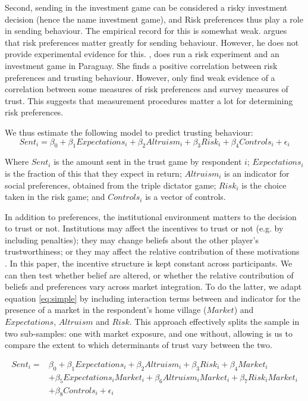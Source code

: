 Second, sending in the investment game can be considered a risky investment decision (hence the name investment game), and Risk preferences thus play a role in sending behaviour. The empirical record for this is somewhat weak. \cite{Karlan2005} argues that risk preferences matter greatly for sending behaviour. However, he does not provide experimental evidence for this. \cite{Schechter2007}, does run a risk experiment and an investment game in Paraguay. She finds a positive correlation between risk preferences and trusting behaviour. However,  \cite{Eckel2004} only find weak evidence of a correlation between some measures of risk preferences and survey measures of trust. This suggests that measurement procedures matter a lot for determining risk preferences.

We thus estimate the following model to predict trusting behaviour:
\begin{equation}
\label{eq:simple}
Sent_i = \beta_0 + \beta_1 Expectations_i + \beta_2 Altruism_i + \beta_3 Risk_i + \beta_4 Controls_i + \epsilon_i 
\end{equation} 

Where $Sent_i$ is the amount sent in the trust game by respondent $i$; $Expectations_i$ is the fraction of this that they expect in return;  $Altruism_i$ is an indicator for social preferences, obtained from the triple dictator game; $Risk_i$ is the choice taken in the risk game; and $Controls_i$ is a vector of controls.

In addition to preferences, the institutional environment matters to the decision to trust or not. Institutions may affect the incentives to trust or not (e.g. by including penalties); they may change beliefs about the other player's trustworthiness; or they may affect the relative contribution of these motivations \citep{Bohnet2007}. In this paper, the incentive structure is kept constant across participants. We can then test whether belief are altered, or whether the relative contribution of beliefs and preferences vary across market integration. To do the latter, we adapt equation \ref{eq:simple} by including interaction terms between and indicator for the presence of a market in the respondent's home village ($Market$) and $Expectations$, $Altruism$ and $Risk$. This approach effectively splits the sample in two sub-samples: one with market exposure, and one without, allowing is us to compare the extent to which determinants of trust vary between the two.

\begin{equation}
\begin{split}
\label{eq:interaction}
Sent_i = & \beta_0 + \beta_1 Expectations_i + \beta_2 Altruism_i + \beta_3 Risk_i + \beta_4 Market_i \\
&+  \beta_5 Expectations_i Market_i +  \beta_6 Altruism_i Market_i   + \beta_7 Risk_i Market_i \\
& + \beta_8 Controls_i + \epsilon_i 
\end{split}
\end{equation} 

